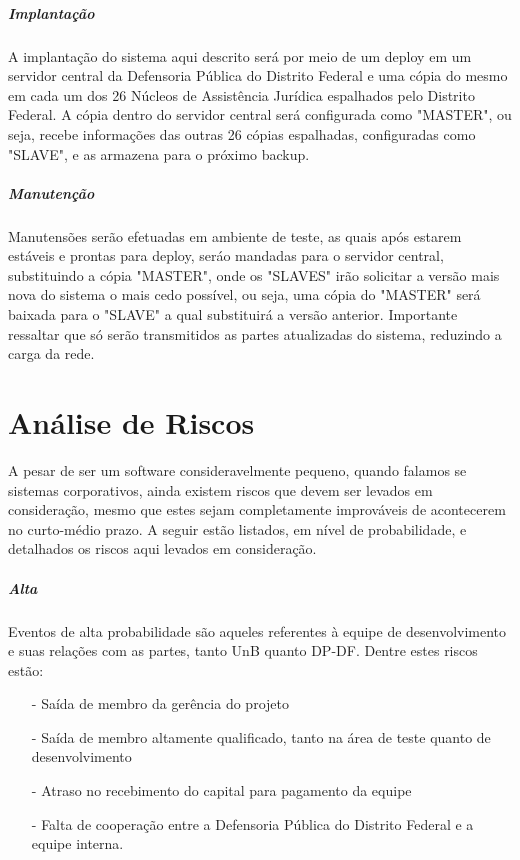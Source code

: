 \documentclass[12pt,a4paper]{report}
\begin{document}
\paragraph{Implantação} A implantação do sistema aqui descrito será por meio de um deploy em um servidor central da Defensoria Pública do Distrito Federal e uma cópia do mesmo em cada um dos 26 Núcleos de Assistência Jurídica espalhados pelo Distrito Federal. A cópia dentro do servidor central será configurada como "MASTER", ou seja, recebe informações das outras 26 cópias espalhadas, configuradas como "SLAVE", e as armazena para o próximo backup.

\paragraph{Manutenção} Manutensões serão efetuadas em ambiente de teste, as quais após estarem estáveis e prontas para deploy, seráo mandadas para o servidor central, substituindo a cópia "MASTER", onde os "SLAVES" irão solicitar a versão mais nova do sistema o mais cedo possível, ou seja, uma cópia do "MASTER" será baixada para o "SLAVE" a qual substituirá a versão anterior. Importante ressaltar que só serão transmitidos as partes atualizadas do sistema, reduzindo a carga da rede.

\chapter{Análise de Riscos}

A pesar de ser um software consideravelmente pequeno, quando falamos se sistemas corporativos, ainda existem riscos que devem ser levados em consideração, mesmo que estes sejam completamente improváveis de acontecerem no curto-médio prazo. A seguir estão listados, em nível de probabilidade, e detalhados os riscos aqui levados em consideração.

\paragraph{Alta} Eventos de alta probabilidade são aqueles referentes à equipe de desenvolvimento e suas relações com as partes, tanto UnB quanto DP-DF. Dentre estes riscos estão:

\begin{itemize}
\item [-] Saída de membro da gerência do projeto
\item [-] Saída de membro altamente qualificado, tanto na área de teste quanto de desenvolvimento
\item [-] Atraso no recebimento do capital para pagamento da equipe
\item [-] Falta de cooperação entre a Defensoria Pública do Distrito Federal e a equipe interna.
\end{itemize}
\end{document}
